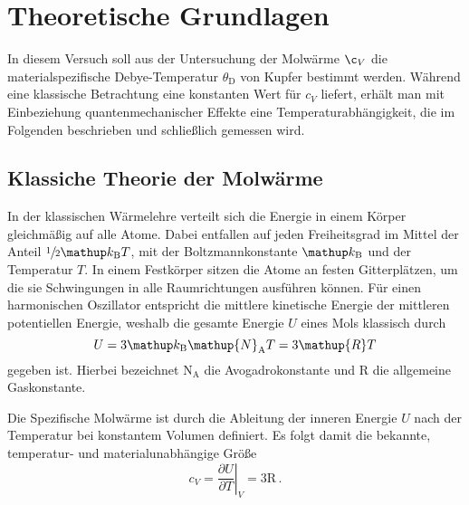 \section{Theoretische Grundlagen}
\label{sec:theorie}
In diesem Versuch soll aus der Untersuchung der Molwärme $\c_V$
die materialspezifische Debye-Temperatur $\theta_\text{D}$ von Kupfer
bestimmt werden.
Während eine klassische Betrachtung eine konstanten Wert für $c_V$
liefert, erhält man mit Einbeziehung quantenmechanischer Effekte eine
Temperaturabhängigkeit, die im Folgenden beschrieben und schließlich 
gemessen wird.

\subsection{Klassiche Theorie der Molwärme}
\label{subsec:klassisch}
In der klassischen Wärmelehre verteilt sich die Energie in einem Körper
gleichmäßig auf alle Atome. Dabei entfallen auf jeden Freiheitsgrad im Mittel
der Anteil $\sfrac{1}{2}\kb T$, mit der Boltzmannkonstante $\kb$ und der
Temperatur $T$.
In einem Festkörper sitzen die Atome an festen Gitterplätzen, um die sie
Schwingungen in alle Raumrichtungen ausführen können. Für einen harmonischen
Oszillator entspricht die mittlere kinetische Energie der mittleren
potentiellen Energie, weshalb die gesamte Energie $U$ eines Mols klassisch
durch
\begin{equation}
    \label{eqn:innere_energie}
    U = 3 \kb \mathup{N}_\text{A} T = 3\mathup{R}T
\end{equation}
gegeben ist. Hierbei bezeichnet $\mathup{N}_\text{A}$ die Avogadrokonstante
und $\mathup{R}$ die allgemeine Gaskonstante.

Die Spezifische Molwärme ist durch die Ableitung der inneren Energie $U$ nach
der Temperatur bei konstantem Volumen definiert. Es folgt damit
die bekannte, temperatur- und materialunabhängige Größe
\begin{equation}
    \label{eqn:cv_klassisch}
    c_V = \left.\frac{\partial U}{\partial T}\right|_V = 3 \mathup{R}\,.
\end{equation}


